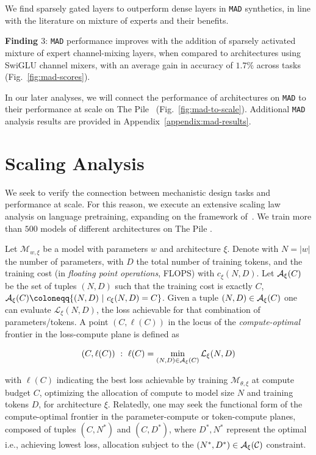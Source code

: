 We find sparsely gated layers to outperform dense layers in {\tt MAD} synthetics, in line with the literature on mixture of experts and their benefits.

\begin{tcolorbox}[enhanced, frame hidden, sharp corners, colback=blue!5, boxsep=0pt, before skip=0pt, after skip=0pt]
   \textbf{Finding $3$}: {\tt MAD} performance improves with the addition of sparsely activated mixture of expert channel-mixing layers, when compared to architectures using SwiGLU channel mixers, with an average gain in accuracy of $1.7\%$ across tasks  (Fig.~\ref{fig:mad-scores}). 
\end{tcolorbox}

In our later analyses, we will connect the performance of architectures on {\tt MAD} to their performance at scale on The Pile~\cite{gao2020pile} (Fig.~\ref{fig:mad-to-scale}).
Additional {\tt MAD} analysis results are provided in Appendix~\ref{appendix:mad-results}.

\section{Scaling Analysis}
\label{sec:results:scaling}

We seek to verify the connection between mechanistic design tasks and performance at scale. For this reason, we execute an extensive scaling law analysis on language pretraining, expanding on the framework of~\cite{kaplan2020scaling,hoffmann2022training}. We train more than $500$ models of different architectures on The Pile \cite{gao2020pile}.

Let $\mathcal{M}_{w, \xi}$ be a model with parameters $w$ and architecture $\xi$. Denote with $N = |w|$ the number of parameters, with $D$ the total number of training tokens, and the training cost (in \textit{floating point operations}, FLOPS) with $c_{\xi}(N, D)$. Let ${\cal{A}}_{\xi}(C)$ be the set of tuples $(N, D)$ such that the training cost is exactly $C$, ${\cal{A}}_{\xi}(C) \coloneqq \{(N, D)~|~c_{\xi}(N, D)=C\}$. Given a tuple $(N,D)\in{\cal{A}}_{\xi}(C)$ one can evaluate $\mathcal{L}_\xi(N,D)$, the loss achievable for that combination of parameters/tokens. A point $(C, \ell(C))$ in the locus of the \textit{compute-optimal} frontier in the loss-compute plane is defined as

\[
    (C, \ell(C))~:~ \ell(C) = \min_{(N,D)\in{\cal{A}}_{\xi}(C)}\mathcal{L}_{\xi}(N, D)
\]

with $\ell(C)$ indicating the best loss achievable by training $\mathcal{M}_{\theta, \xi}$ at compute budget $C$, optimizing the allocation of compute to model size $N$ and training tokens $D$, for architecture $\xi$. Relatedly, one may seek the functional form of the compute-optimal frontier in the parameter-compute or token-compute planes, composed of tuples $(C, N^*)$ and $(C, D^*)$, where $D^*, N^*$ represent the optimal i.e., achieving lowest loss, allocation subject to the $(N^*, D^*) \in \cal{A}_{\xi}(C)$ constraint.

